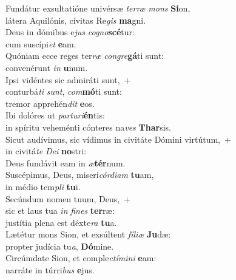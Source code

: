 \evenverse Fundátur exsultatióne univérsæ \textit{ter}\textit{ræ} \textit{mons} \textbf{Si}on,~\*\\
\evenverse látera Aquilónis, cívitas Re\textit{gis} \textbf{ma}gni.\\
\oddverse Deus in dómibus e\textit{jus} \textit{co}\textit{gno}\textbf{scé}tur:~\*\\
\oddverse cum suscípi\textit{et} \textbf{e}am.\\
\evenverse Quóniam ecce reges ter\textit{ræ} \textit{con}\textit{gre}\textbf{gá}ti sunt:~\*\\
\evenverse convenérunt \textit{in} \textbf{u}num.\\
\oddverse Ipsi vidéntes sic admiráti sunt,~+\\
\oddverse  conturbá\textit{ti} \textit{sunt}, \textit{com}\textbf{mó}ti sunt:~\*\\
\oddverse tremor apprehén\textit{dit} \textbf{e}os.\\
\evenverse Ibi dolóres ut \textit{par}\textit{tu}\textit{ri}\textbf{én}tis:~\*\\
\evenverse in spíritu veheménti cónteres na\textit{ves} \textbf{Thar}sis.\\
\oddverse Sicut audívimus, sic vídimus in civitáte Dómini virtútum,~+\\
\oddverse  in civitá\textit{te} \textit{De}\textit{i} \textbf{no}stri:~\*\\
\oddverse Deus fundávit eam in \textit{æ}\textbf{tér}num.\\
\evenverse Suscépimus, Deus, miseri\textit{cór}\textit{di}\textit{am} \textbf{tu}am,~\*\\
\evenverse in médio tem\textit{pli} \textbf{tu}i.\\
\oddverse Secúndum nomen tuum, Deus,~+\\
\oddverse  sic et laus tua \textit{in} \textit{fi}\textit{nes} \textbf{ter}ræ:~\*\\
\oddverse justítia plena est déxte\textit{ra} \textbf{tu}a.\\
\evenverse Lætétur mons Sion, et exsúltent \textit{fí}\textit{li}\textit{æ} \textbf{Ju}dæ:~\*\\
\evenverse propter judícia tu\textit{a}, \textbf{Dó}mine.\\
\oddverse Circúmdate Sion, et comple\textit{ctí}\textit{mi}\textit{ni} \textbf{e}am:~\*\\
\oddverse narráte in túrri\textit{bus} \textbf{e}jus.\\

